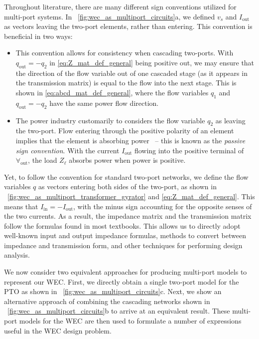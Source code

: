 \documentclass[twocolumn]{autart}
\begin{document}
Throughout literature, there are many different sign conventions utilized for multi-port systems. 
In \figurename~\ref{fig:wec_as_multiport_circuits}a, we defined $v_s$ and $I_{\textrm{out}}$ as vectors leaving the two-port elements, rather than entering. 
This convention is beneficial in two ways:
\begin{itemize}
         \item This convention allows for consistency when cascading two-ports. 
         With $q_{\textrm{out}} = -q_2$ in \eqref{eq:Z_mat_def_general} being positive out, we may ensure that the direction of the flow variable out of one cascaded stage (as it appears in the transmission matrix) is equal to the flow into the next stage. 
         This is shown in \eqref{eq:abcd_mat_def_general}, where the flow variables $q_1$ and $q_{\textrm{out}} = -q_2$ have the same power flow direction.
         \item The power industry customarily to considers the flow variable $q_2$ as leaving the two-port. 
         Flow entering through the positive polarity of an element implies that the element is absorbing power~\cite{CircuitFundamental} -- this is known as the \textit{passive sign convention}.
         With the current $I_{\textrm{out}}$ flowing into the positive terminal of $\forall_{\textrm{out}}$, the load $Z_\ell$ absorbs power when power is positive.
\end{itemize}
Yet, to follow the convention for standard two-port networks, we define the flow variables $q$ as vectors entering both sides of the two-port, as shown in \figurename~\ref{fig:wec_as_multiport_transformer_gyrator} and \eqref{eq:Z_mat_def_general}. 
This means that $I_{\textrm{in}} = -I_{\textrm{out}}$, with the minus sign accounting for the opposite senses of the two currents. 
As a result, the impedance matrix and the transmission matrix follow the formulas found in most textbooks. 
This allows us to directly adopt well-known input and output impedance formulas, methods to convert between impedance and transmission form, and other techniques for performing design analysis.

We now consider two equivalent approaches for producing multi-port models to represent our WEC.
First, we directly obtain a single two-port model for the PTO as shown in \figurename~\ref{fig:wec_as_multiport_circuits}c.
Next, we show an alternative approach of combining the cascading networks shown in \figurename~\ref{fig:wec_as_multiport_circuits}b to arrive at an equivalent result.
These multi-port models for the WEC are then used to formulate a number of expressions useful in the WEC design problem.
\end{document}
